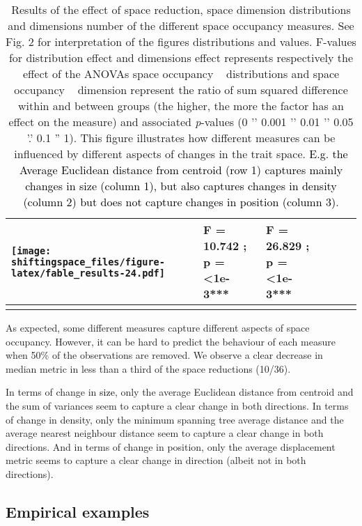 \documentclass[]{article}
\begin{document}
\begin{longtable}[]{@{}llllll@{}}
\begin{minipage}[t]{0.13\columnwidth}
\texttt{[image: shiftingspace\_files/figure-latex/fable\_results-24.pdf]}\strut
\end{minipage} & \begin{minipage}[t]{0.17\columnwidth}\raggedright\strut
F = 10.742 ; p = \textless{}1e-3***\strut
\end{minipage} & \begin{minipage}[t]{0.23333\columnwidth}\raggedright\strut
F = 26.829 ; p = \textless{}1e-3***\strut
\end{minipage}\tabularnewline
\bottomrule
\caption{Results of the effect of space reduction, space dimension
distributions and dimensions number of the different space occupancy
measures. See Fig. 2 for interpretation of the figures distributions and values. F-values for distribution effect and dimensions effect represents respectively the effect of the ANOVAs  space occupancy ~ distributions and space occupancy ~ dimension  represent the ratio of sum squared difference within and between groups (the higher, the more the factor has an effect on the measure) and associated  \textit{p}-values (0 '\*\*\*' 0.001 '\*\*' 0.01 '\*' 0.05 '.' 0.1 '' 1). This figure illustrates how different measures can be influenced by different aspects of changes in the trait space.\textcolor{black}{ E.g. the Average Euclidean distance from centroid (row 1) captures mainly changes in size (column 1), but also captures changes in density (column 2) but does not capture changes in position (column 3)}.}
\end{longtable}

\renewcommand\baselinestretch{1.6}\selectfont


As expected, some different measures capture different aspects of space
occupancy. However, it can be hard to predict the behaviour of each
measure when 50\% of the observations are removed. We observe a clear
decrease in median metric in less than a third of the space reductions
(10/36).

In terms of change in \textcolor{black}{size}, only the
average Euclidean distance from centroid and the sum of variances seem
to capture a clear change in both directions. In terms of change in
density, only the minimum spanning tree average distance and the average
nearest neighbour distance seem to capture a clear change in both
directions. And in terms of change in position, only the average
displacement metric seems to capture a clear change in direction (albeit
not in both directions).

\subsection{Empirical examples}\label{empirical-example}
\end{document}
